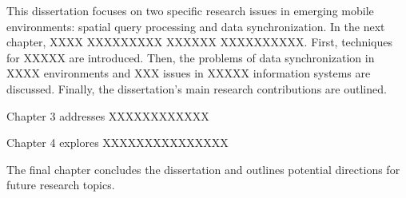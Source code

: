 This dissertation focuses on two specific research issues in emerging mobile environments: spatial query processing and data synchronization. In the next chapter, XXXX XXXXXXXXX XXXXXX XXXXXXXXXX. First, techniques for XXXXX are introduced. Then, the problems of data synchronization in XXXX environments and XXX issues in XXXXX information systems are discussed. Finally, the dissertation's main research contributions are outlined.

Chapter 3 addresses XXXXXXXXXXXX

Chapter 4 explores XXXXXXXXXXXXXXX

The final chapter concludes the dissertation and outlines potential directions for future research topics.